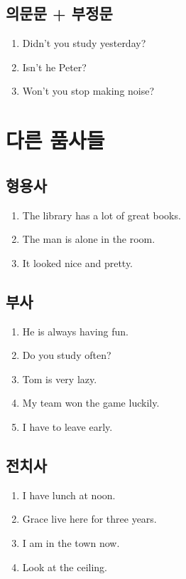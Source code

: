 \documentclass[a4paper, 12pt, twocolumn]{oblivoir}
\begin{document}
    \subsection{의문문 + 부정문}
    \begin{enumerate}
        \item Didn't you study yesterday?
        \item Isn't he Peter? 
        \item Won't you stop making noise?
    \end{enumerate}
    \section{다른 품사들} %
    \subsection{형용사}
    \begin{enumerate}
        \item The library has a lot of great books. 
        \item The man is alone in the room. 
        \item It looked nice and pretty. 
    \end{enumerate}
    \subsection{부사}
    \begin{enumerate}
        \item He is always having fun.
        \item Do you study often?
        \item Tom is very lazy. 
        \item My team won the game luckily.
        \item I have to leave early. 
    \end{enumerate}
    \subsection{전치사}
    \begin{enumerate}
        \item I have lunch at noon.
        \item Grace live here for three years. 
        \item I am in the town now. 
        \item Look at the ceiling.
    \end{enumerate}
\end{document}
